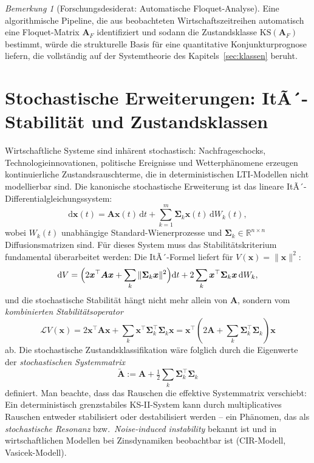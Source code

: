 ﻿\documentclass[12pt, a4paper, titlepage]{report}
\theoremstyle{definition}
\theoremstyle{remark}
\newtheorem{remark}[theorem]{Bemerkung}
\newcommand{\R}{\mathbb{R}}
\newcommand{\vx}{\bm{x}}
\newcommand{\vA}{\bm{A}}
\newcommand{\vSigma}{\bm{\Sigma}}
\newcommand{\T}{\top}
\newcommand{\KS}{\mathrm{KS}}
\begin{document}
\begin{remark}[Forschungsdesiderat: Automatische Floquet-Analyse]
Eine algorithmische Pipeline, die aus beobachteten Wirtschaftszeitreihen automatisch
eine Floquet-Matrix $\vA_F$ identifiziert und sodann die Zustandsklasse $\KS(\vA_F)$
bestimmt, würde die strukturelle Basis für eine quantitative Konjunkturprognose
liefern, die vollständig auf der Systemtheorie des Kapitels~\ref{sec:klassen}
beruht.
\end{remark}

\section{Stochastische Erweiterungen: ItÃ´-Stabilität und Zustandsklassen}
\label{subsec:stochastisch}

Wirtschaftliche Systeme sind inhärent stochastisch: Nachfrageschocks,
Technologieinnovationen, politische Ereignisse und Wetterphänomene erzeugen
kontinuierliche Zustandsrauschterme, die in deterministischen LTI-Modellen nicht
modellierbar sind. Die kanonische stochastische Erweiterung ist das lineare
ItÃ´-Differentialgleichungssystem:
\begin{equation}
  \mathrm{d}\vx(t) = \vA\vx(t)\,\mathrm{d}t + \sum_{k=1}^m \vSigma_k\vx(t)\,\mathrm{d}W_k(t),
  \label{eq:ito_system}
\end{equation}
wobei $W_k(t)$ unabhängige Standard-Wienerprozesse und $\vSigma_k \in \R^{n \times n}$
Diffusionsmatrizen sind. Für dieses System muss das Stabilitätskriterium fundamental
überarbeitet werden: Die ItÃ´-Formel liefert für $V(\vx) = \|\vx\|^2$:
\begin{equation}
  \mathrm{d}V = \Bigl(2\vx^\T\vA\vx + \sum_k \|\vSigma_k\vx\|^2\Bigr)\mathrm{d}t
    + 2\sum_k \vx^\T\vSigma_k\vx\,\mathrm{d}W_k,
  \label{eq:ito_formel}
\end{equation}
und die stochastische Stabilität hängt nicht mehr allein von $\vA$, sondern vom
\emph{kombinierten Stabilitätsoperator}
\begin{equation}
  \mathcal{L}V(\vx) = 2\vx^\T\vA\vx + \sum_k \vx^\T\vSigma_k^\T\vSigma_k\vx
  = \vx^\T\!\left(2\vA + \sum_k \vSigma_k^\T\vSigma_k\right)\!\vx
  \label{eq:stabop}
\end{equation}
ab. Die stochastische Zustandsklassifikation wäre folglich durch die Eigenwerte der
\emph{stochastischen Systemmatrix}
\begin{equation}
  \tilde{\vA} := \vA + \tfrac{1}{2}\sum_k \vSigma_k^\T\vSigma_k
  \label{eq:stoch_sysmat}
\end{equation}
definiert. Man beachte, dass das Rauschen die effektive Systemmatrix verschiebt: Ein
deterministisch grenzstabiles KS-II-System kann durch multiplicatives Rauschen
entweder stabilisiert oder destabilisiert werden -- ein Phänomen, das als
\emph{stochastische Resonanz} bzw.~\emph{Noise-induced instability} bekannt ist und
in wirtschaftlichen Modellen bei Zinsdynamiken beobachtbar ist (CIR-Modell, Vasicek-Modell).
\end{document}
